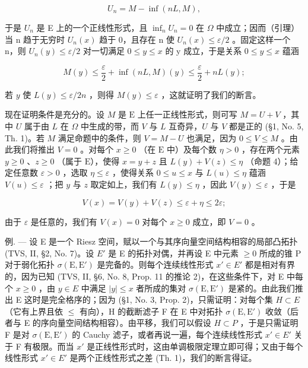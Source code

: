 \[
U _ {n} = M - \inf (n L, M),
\]

于是 \(U_{n}\) 是 E 上的一个正线性形式，且 \(\inf_{n} U_{n} = 0\) 在 \(\Omega\) 中成立；因而（引理）当 n 趋于无穷时 \(U_{n}(x)\) 趋于 0，且存在 n 使 \(U_{n}(x) \leqslant \varepsilon / 2\) 。固定这样一个 n，则 \(U_{n}(y) \leqslant \varepsilon / 2\) 对一切满足 \(0 \leqslant y \leqslant x\) 的 y 成立，于是关系 \(0 \leqslant y \leqslant x\) 蕴涵

\[
M (y) \leqslant \frac {\varepsilon}{2} + \inf (n L, M) (y) \leqslant \frac {\varepsilon}{2} + n L (y);
\]

若 \(y\) 使 \(L(y) \leqslant \varepsilon / 2n\) ，则得 \(M(y) \leqslant \varepsilon\) ，这就证明了我们的断言。

现在证明条件是充分的。设 \(M\) 是 \(\mathrm{E}\) 上任一正线性形式，则可写 \(M = U + V\) ，其中 \(U\) 属于由 \(L\) 在 \(\Omega\) 中生成的带，而 \(V\) 与 \(L\) 互奇异，\(U\) 与 \(V\) 都是正的 (§1, No. 5, Th. 1)。若 \(M\) 满足命题中的条件，则 \(V = M - U\) 也满足，因为 \(0 \leqslant V \leqslant M\) 。由此我们将推出 \(V = 0\) 。对每个 \(x \geqslant 0\) （在 \(\mathrm{E}\) 中）及每个数 \(\eta > 0\) ，存在两个元素 \(y \geqslant 0\) 、\(z \geqslant 0\) （属于 \(\mathrm{E}\)），使得 \(x = y + z\) 且 \(L(y) + V(z) \leqslant \eta\) （命题 4）；给定任意数 \(\varepsilon > 0\) ，选取 \(\eta \leqslant \varepsilon\) ，使得关系 \(0 \leqslant u \leqslant x\) 与 \(L(u) \leqslant \eta\) 蕴涵 \(V(u) \leqslant \varepsilon\) ；把 \(y\) 与 \(z\) 取定如上，我们有 \(L(y) \leqslant \eta\) ，因此 \(V(y) \leqslant \varepsilon\) ，于是

\[
V (x) = V (y) + V (z) \leqslant \varepsilon + \eta \leqslant 2 \varepsilon ;
\]

由于 \(\varepsilon\) 是任意的，我们有 \(V(x) = 0\) 对每个 \(x \geqslant 0\) 成立，即 \(V = 0\) 。

例. --- 设 E 是一个 Riesz 空间，赋以一个与其序向量空间结构相容的局部凸拓扑 (TVS, II, §2, No. 7)。设 \(E'\) 是 E 的拓扑对偶，并再设 E 中元素 \(\geqslant 0\) 所成的锥 P 对于弱化拓扑 \(\sigma(\mathrm{E},\mathrm{E}')\) 是完备的。则每个连续线性形式 \(x' \in E'\) 都是相对有界的，因为已知 (TVS, II, §6, No. 8, Prop. 11 的推论 2)，在这些条件下，对 E 中每个 \(x \geqslant 0\) ，由 \(y \in E\) 中满足 \(|y| \leqslant x\) 者所成的集对 \(\sigma(\mathrm{E},\mathrm{E}')\) 是紧的。由此我们推出 E 这时是完全格序的；因为 (§1, No. 3, Prop. 2)，只需证明：对每个集 \(H \subset E\) （它有上界且依 \(\leqslant\) 有向），H 的截断滤子 F 在 E 中对拓扑 \(\sigma(\mathrm{E},\mathrm{E}')\) 收敛（后者与 E 的序向量空间结构相容）。由平移，我们可以假设 \(H \subset P\) ，于是只需证明 F 是对 \(\sigma(\mathrm{E},\mathrm{E}')\) 的 Cauchy 滤子，或者再说一遍，每个连续线性形式 \(x' \in E'\) 关于 F 有极限。而当 \(x'\) 是正线性形式时，这由单调极限定理立即可得；又由于每个线性形式 \(x' \in E'\) 是两个正线性形式之差 (Th. 1)，我们的断言得证。
\relax{}
